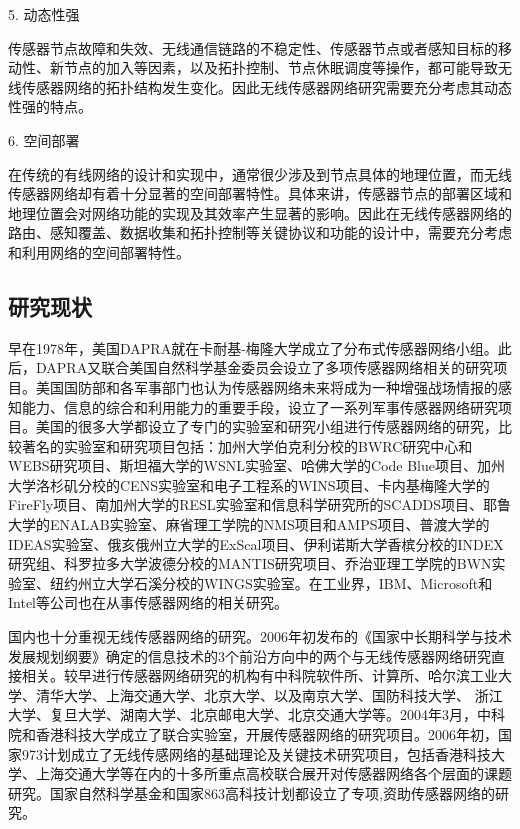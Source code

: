 5. 动态性强

传感器节点故障和失效、无线通信链路的不稳定性、传感器节点或者感知目标的移动性、新节点的加入等因素，以及拓扑控制、节点休眠调度等操作，都可能导致无线传感器网络的拓扑结构发生变化。因此无线传感器网络研究需要充分考虑其动态性强的特点。

6. 空间部署

在传统的有线网络的设计和实现中，通常很少涉及到节点具体的地理位置，而无线传感器网络却有着十分显著的空间部署特性。具体来讲，传感器节点的部署区域和地理位置会对网络功能的实现及其效率产生显著的影响。因此在无线传感器网络的路由、感知覆盖、数据收集和拓扑控制等关键协议和功能的设计中，需要充分考虑和利用网络的空间部署特性。

\subsection{研究现状}
早在1978年，美国DAPRA就在卡耐基-梅隆大学成立了分布式传感器网络小组。此后，DAPRA又联合美国自然科学基金委员会设立了多项传感器网络相关的研究项目。美国国防部和各军事部门也认为传感器网络未来将成为一种增强战场情报的感知能力、信息的综合和利用能力的重要手段，设立了一系列军事传感器网络研究项目。美国的很多大学都设立了专门的实验室和研究小组进行传感器网络的研究，比较著名的实验室和研究项目包括：加州大学伯克利分校的BWRC研究中心和WEBS研究项目、斯坦福大学的WSNL实验室、哈佛大学的Code Blue项目、加州大学洛杉矶分校的CENS实验室和电子工程系的WINS项目、卡内基梅隆大学的FireFly项目、南加州大学的RESL实验室和信息科学研究所的SCADDS项目、耶鲁大学的ENALAB实验室、麻省理工学院的NMS项目和AMPS项目、普渡大学的IDEAS实验室、俄亥俄州立大学的ExScal项目、伊利诺斯大学香槟分校的INDEX研究组、科罗拉多大学波德分校的MANTIS研究项目、乔治亚理工学院的BWN实验室、纽约州立大学石溪分校的WINGS实验室。在工业界，IBM、Microsoft和Intel等公司也在从事传感器网络的相关研究。

国内也十分重视无线传感器网络的研究。2006年初发布的《国家中长期科学与技术发展规划纲要》确定的信息技术的3个前沿方向中的两个与无线传感器网络研究直接相关。较早进行传感器网络研究的机构有中科院软件所、计算所、哈尔滨工业大学、清华大学、上海交通大学、北京大学、以及南京大学、国防科技大学、 浙江大学、复旦大学、湖南大学、北京邮电大学、北京交通大学等。2004年3月，中科院和香港科技大学成立了联合实验室，开展传感器网络的研究项目。2006年初，国家973计划成立了无线传感网络的基础理论及关键技术研究项目，包括香港科技大学、上海交通大学等在内的十多所重点高校联合展开对传感器网络各个层面的课题研究。国家自然科学基金和国家863高科技计划都设立了专项,资助传感器网络的研究。

